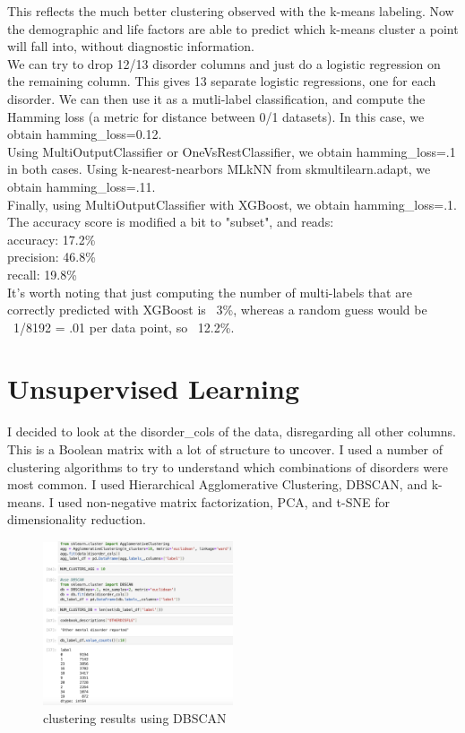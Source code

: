 \documentclass[11pt]{amsart}
\begin{document}
This reflects the much better clustering observed with the k-means labeling. Now the demographic and life factors are able to predict which k-means cluster a point will fall into, without diagnostic information. \\

We can try to drop 12/13 disorder columns and just do a logistic regression on the remaining column. This gives 13 separate logistic regressions, one for each disorder. We can then use it as a mutli-label classification, and compute the Hamming loss (a metric for distance between 0/1 datasets). In this case, we obtain hamming\_loss=0.12. \\

Using MultiOutputClassifier or OneVsRestClassifier, we obtain hamming\_loss=.1 in both cases. Using k-nearest-nearbors MLkNN from skmultilearn.adapt, we obtain hamming\_loss=.11. \\

Finally, using MultiOutputClassifier with XGBoost, we obtain hamming\_loss=.1. The accuracy score is modified a bit to "subset", and reads: \\

\noindent accuracy: 17.2\% \\
precision: 46.8\% \\
recall: 19.8\% \\

It's worth noting that just computing the number of multi-labels that are correctly predicted with XGBoost is ~3\%, whereas a random guess would be ~1/8192 = .01 per data point, so ~12.2\%.

\section{Unsupervised Learning}

I decided to look at the disorder\_cols of the data, disregarding all other columns. This is a Boolean matrix with a lot of structure to uncover. I used a number of clustering algorithms to try to understand which combinations of disorders were most common. I used Hierarchical Agglomerative Clustering, DBSCAN, and k-means. I used non-negative matrix factorization, PCA, and t-SNE for dimensionality reduction.

\begin{figure}[h]
\caption{clustering results using DBSCAN}
\centering
\includegraphics[width=0.5\textwidth]{clustering_techniques.png}
\end{figure}
\end{document}
